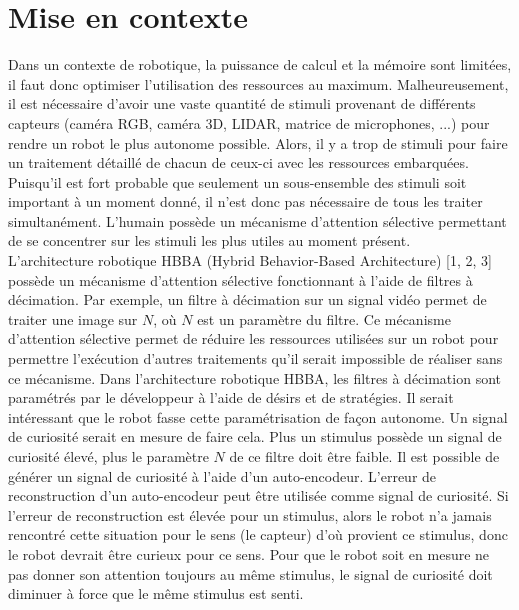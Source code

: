 \section{Mise en contexte}
    Dans un contexte de robotique, la puissance de calcul et la mémoire sont limitées, il faut donc optimiser l'utilisation des ressources au maximum. Malheureusement, il est nécessaire d’avoir une vaste quantité de stimuli provenant de différents capteurs (caméra RGB, caméra 3D, LIDAR, matrice de microphones, ...) pour rendre un robot le plus autonome possible. Alors, il y a trop de stimuli pour faire un traitement détaillé de chacun de ceux-ci avec les ressources embarquées. Puisqu’il est fort probable que seulement un sous-ensemble des stimuli soit important à un moment donné, il n’est donc pas nécessaire de tous les traiter simultanément. L’humain possède un mécanisme d’attention sélective permettant de se concentrer sur les stimuli les plus utiles au moment présent.\\
    
    L’architecture robotique HBBA (Hybrid Behavior-Based Architecture)  [1, 2, 3] possède un mécanisme d’attention sélective fonctionnant à l’aide de filtres à décimation. Par exemple, un filtre à décimation sur un signal vidéo permet de traiter une image sur \(N\), où \(N\) est un paramètre du filtre. Ce mécanisme d’attention sélective permet de réduire les ressources utilisées sur un robot pour permettre l’exécution d’autres traitements qu’il serait impossible de réaliser sans ce mécanisme. Dans l’architecture robotique HBBA, les filtres à décimation sont paramétrés par le développeur à l'aide de désirs et de stratégies. Il serait intéressant que le robot fasse cette paramétrisation de façon autonome. Un signal de curiosité serait en mesure de faire cela. Plus un stimulus possède un signal de curiosité élevé, plus le paramètre \(N\) de ce filtre doit être faible. Il est possible de  générer un signal de curiosité à l’aide d’un auto-encodeur. L’erreur de reconstruction d’un auto-encodeur peut être utilisée comme signal de curiosité. Si l'erreur de reconstruction est élevée pour un stimulus, alors le robot n'a jamais rencontré cette situation pour le sens (le capteur) d’où provient ce stimulus, donc le robot devrait être curieux pour ce sens. Pour que le robot soit en mesure ne pas donner son attention toujours au même stimulus, le signal de curiosité doit diminuer à force que le même stimulus est senti.\\
    
